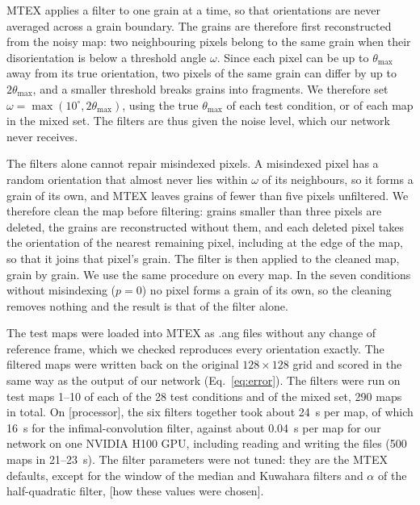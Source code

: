 MTEX applies a filter to one grain at a time, so that orientations are never
averaged across a grain boundary. The grains are therefore first
reconstructed from the noisy map: two neighbouring pixels belong to the same
grain when their disorientation is below a threshold angle $\omega$. Since
each pixel can be up to $\theta_{\max}$ away from its true orientation, two
pixels of the same grain can differ by up to $2\theta_{\max}$, and a smaller
threshold breaks grains into fragments. We therefore set
$\omega = \max(10^\circ, 2\theta_{\max})$, using the true $\theta_{\max}$ of
each test condition, or of each map in the mixed set. The filters are thus
given the noise level, which our network never receives.

The filters alone cannot repair misindexed pixels. A misindexed pixel has a
random orientation that almost never lies within $\omega$ of its neighbours,
so it forms a grain of its own, and MTEX leaves grains of fewer than five
pixels unfiltered. We therefore clean the map before filtering: grains
smaller than three pixels are deleted, the grains are reconstructed without
them, and each deleted pixel takes the orientation of the nearest remaining
pixel, including at the edge of the map, so that it joins that pixel's grain.
The filter is then applied to the cleaned map, grain by grain. We use the
same procedure on every map. In the seven conditions without misindexing
($p = 0$) no pixel forms a grain of its own, so the cleaning removes nothing
and the result is that of the filter alone.

The test maps were loaded into MTEX as .ang files without any change
of reference frame, which we checked reproduces every orientation exactly.
The filtered maps were written back on the original $128 \times 128$ grid and
scored in the same way as the output of our network (Eq.~\ref{eq:error}). The
filters were run on test maps 1--10 of each of the 28 test conditions and of
the mixed set, 290 maps in total. On [processor], the six filters together
took about 24~s per map, of which 16~s for the infimal-convolution filter,
against about 0.04~s per map for our network on one NVIDIA H100 GPU,
including reading and writing the files (500 maps in 21--23~s). The filter parameters were not tuned:
they are the MTEX defaults, except for the window of the median and Kuwahara
filters and $\alpha$ of the half-quadratic filter, [how these values were
chosen].
